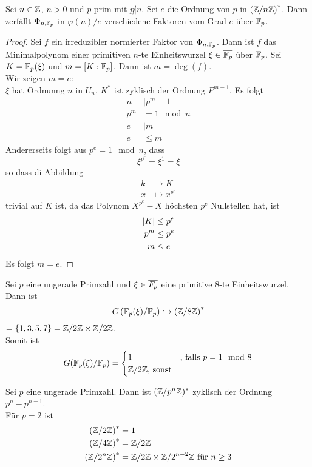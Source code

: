 	\begin{satz}
		Sei $n\in\mathbb{Z}$, $n>0$ und $p$ prim mit $p\not| n$. Sei $e$ die Ordnung von $p$ in $\left(\mathbb{Z}/n\mathbb{Z}\right)^*$. Dann zerfällt $\Phi_{n,\mathbb{F}_p}$ in $\varphi(n)/e$ verschiedene Faktoren vom Grad $e$ über $\mathbb{F}_p$.
	\end{satz}
	\begin{proof}
		Sei $f$ ein irreduzibler normierter Faktor von $\Phi_{n,\mathbb{F}_p}$. Dann ist $f$ das Minimalpolynom einer primitiven $n$-te Einheitswurzel $\xi\in\overline{\mathbb{F}_p}$ über $\mathbb{F}_p$. Sei $K=\mathbb{F}_p(\xi)$ und $m=[K:\mathbb{F}_p]$. Dann ist $m=\deg(f)$. \\
		Wir zeigen $m=e$:\\
		$\xi$ hat Ordnunng $n$ in $U_n$, $K^*$ ist zyklisch der Ordnung $P^{m-1}$. Es folgt
		\begin{align*}
			n&|p^m-1\\
			p^{m}&=1\mod n\\
			e&|m\\
			e&\leq m
		\end{align*}
		Andererseits folgt aus $p^e=1\mod n$, dass
		\[\xi^{p^e}=\xi^1=\xi\]
		so dass di Abbildung
		\begin{align*}
		k&\to K\\
		x&\mapsto x^{p^e}
		\end{align*}
		trivial auf $K$ ist, da das Polynom $X^{p^e}-X$ höchsten $p^e$ Nullstellen hat, ist
		\begin{align*}
		\left|K\right|&\leq p^e\\
		p^m&\leq p^e\\
		m&\leq e
		\end{align*}
		Es folgt $m=e$.
	\end{proof}

	\begin{exm}
		Sei $p$ eine ungerade Primzahl und $\xi\in\overline{F_p}$ eine primitive 8-te Einheitswurzel. Dann ist
		\[G\left(\mathbb{F}_p(\xi)/\mathbb{F}_p\right)\hookrightarrow \left(\mathbb{Z}/8\mathbb{Z}\right)^*\]
		$=\{1,3,5,7\}=\mathbb{Z}/2\mathbb{Z}\times\mathbb{Z}/2\mathbb{Z}$.\\
		Somit ist
		\[G(\mathbb{F}_p(\xi)/\mathbb{F}_p)=\begin{cases}
		1&\text{, falls }p=1\mod 8\\
		\mathbb{Z}/2\mathbb{Z}\text{, sonst}
		\end{cases}\]
	\end{exm}

	\begin{bem}
		Sei $p$ eine ungerade Primzahl. Dann ist $(\mathbb{Z}/p^n\mathbb{Z})^*$ zyklisch der Ordnung $p^{n}-p^{n-1}$.\\
		Für $p=2$ ist
		\begin{align*}
		\left(\mathbb{Z}/2\mathbb{Z}\right)^*&=1\\
		\left(\mathbb{Z}/4\mathbb{Z}\right)^*&=\mathbb{Z}/2\mathbb{Z}\\
		\left(\mathbb{Z}/2^n\mathbb{Z}\right)^*&=\mathbb{Z}/2\mathbb{Z}\times \mathbb{Z}/2^{n-2}\mathbb{Z}\text{ für $n\geq 3$}
		\end{align*}
	\end{bem}





